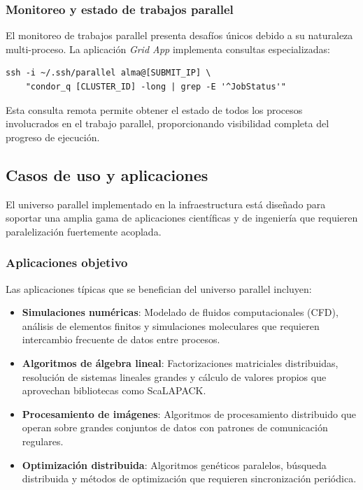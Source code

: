 \subsubsection{Monitoreo y estado de trabajos parallel}
\noindent

El monitoreo de trabajos parallel presenta desafíos únicos debido a su naturaleza multi-proceso. La aplicación \textit{Grid App} implementa consultas especializadas:

\begin{verbatim}
ssh -i ~/.ssh/parallel alma@[SUBMIT_IP] \
    "condor_q [CLUSTER_ID] -long | grep -E '^JobStatus'"
\end{verbatim}

Esta consulta remota permite obtener el estado de todos los procesos involucrados en el trabajo parallel, proporcionando visibilidad completa del progreso de ejecución.

\subsection{Casos de uso y aplicaciones}
\noindent

El universo parallel implementado en la infraestructura \GRID está diseñado para soportar una amplia gama de aplicaciones científicas y de ingeniería que requieren paralelización fuertemente acoplada.

\subsubsection{Aplicaciones objetivo}
\noindent

Las aplicaciones típicas que se benefician del universo parallel incluyen:

\begin{itemize}
	\item \textbf{Simulaciones numéricas}: Modelado de fluidos computacionales (CFD), análisis de elementos finitos y simulaciones moleculares que requieren intercambio frecuente de datos entre procesos.
	
	\item \textbf{Algoritmos de álgebra lineal}: Factorizaciones matriciales distribuidas, resolución de sistemas lineales grandes y cálculo de valores propios que aprovechan bibliotecas como ScaLAPACK\@.
	
	\item \textbf{Procesamiento de imágenes}: Algoritmos de procesamiento distribuido que operan sobre grandes conjuntos de datos con patrones de comunicación regulares.
	
	\item \textbf{Optimización distribuida}: Algoritmos genéticos paralelos, búsqueda distribuida y métodos de optimización que requieren sincronización periódica.
\end{itemize}

